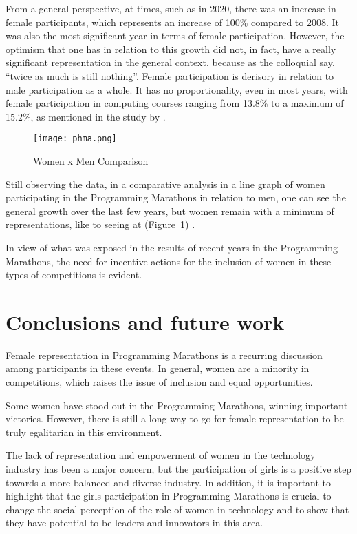 \documentclass[12pt]{article}
\begin{document}
From a general perspective, at times, such as in 2020, there was an increase in female participants, which represents an increase of 100\% compared to 2008. It was also the most significant year in terms of female participation. However, the optimism that one has in relation to this growth did not, in fact, have a really significant representation in the general context, because as the colloquial say, “twice as much is still nothing”. Female participation is derisory in relation to male participation as a whole. It has no proportionality, even in most years, with female participation in computing courses ranging from 13.8\% to a maximum of 15.2\%, as mentioned in the study by \cite{Santos:21}.

\begin{figure}[ht!]
\centering
\texttt{[image: phma.png]}
\caption{Women x Men Comparison}
\label{fig:exampleFig6}
\end{figure}

Still observing the data, in a comparative analysis in a line graph of women participating in the Programming Marathons in relation to men, one can see the general growth over the last few years, but  women remain with a minimum of representations, like to seeing at (Figure~\ref{fig:exampleFig6}) \cite{SBC:23}.
 
In view of what was exposed in the results of recent years in the Programming Marathons, the need for incentive actions for the inclusion of women in these types of competitions is evident.

\section{Conclusions and future work}
Female representation in Programming Marathons is a recurring discussion among participants in these events. In general, women are a minority in competitions, which raises the issue of inclusion and equal opportunities.

Some women have stood out in the Programming Marathons, winning important victories. However, there is still a long way to go for female representation to be truly egalitarian in this environment.

The lack of representation and empowerment of women in the technology industry has been a major concern, but the participation of girls is a positive step towards a more balanced and diverse industry. In addition, it is important to highlight that the girls participation in Programming Marathons is crucial to change the social perception of the role of women in technology and to show that they have potential to be leaders and innovators in this area.
\end{document}
